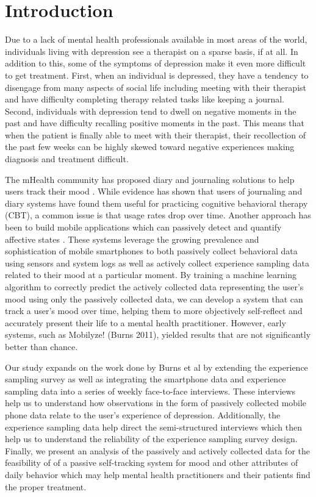 \section{Introduction}

Due to a lack of mental health professionals available in most areas 
of the world, individuals living with depression see a therapist on 
a sparse basis, if at all. In addition to this, some of the symptoms 
of depression make it even more difficult to get treatment. First, 
when an individual is depressed, they have a tendency to disengage 
from many aspects of social life including meeting with their therapist 
and have difficulty completing therapy related tasks like keeping a 
journal. Second, individuals with depression tend to dwell on 
negative moments in the past and have difficulty recalling positive 
moments in the past. This means that when the patient is finally able 
to meet with their therapist, their recollection of the past few weeks 
can be highly skewed toward negative experiences making diagnosis and 
treatment difficult.

The mHealth community has proposed diary and journaling solutions to help
users track their mood \cite{Ahtinen2013}.  While evidence has shown that users
of journaling and diary systems have found them useful for 
practicing cognitive behavioral therapy (CBT), a common issue
is that usage rates drop over time.  Another approach
has been to build mobile applications which can passively detect and
quantify affective states \cite{Burns2011,Lu2012a}. These systems leverage the growing prevalence and sophistication 
of mobile smartphones to both passively collect behavioral data using 
sensors and system logs as well as actively collect experience sampling 
data related to their mood at a particular moment.  By training a 
machine learning algorithm to correctly predict the actively collected 
data representing the user’s mood using only the passively collected data, 
we can develop a system that can track a user’s mood over time, 
helping them to more objectively self-reflect and accurately present 
their life to a mental health practitioner.  However, early systems, 
such as Mobilyze! (Burns 2011), yielded results that are not significantly better 
than chance.

Our study expands on the work done by Burns et al %
by extending the experience sampling survey as 
well as integrating the smartphone data
and experience sampling data into a series of weekly 
face-to-face interviews.  These interviews
help us to understand how observations in the 
form of passively collected mobile phone data
relate to the user's experience of depression.
Additionally, the experience sampling data help 
direct the semi-structured interviews which then
help us to understand the reliability of the 
experience sampling survey design.  Finally,
we present an analysis of the passively
and actively collected data for the feasibility of
of a passive self-tracking system for mood
and other attributes of daily behavior
which may help mental health practitioners
and their patients find the proper 
treatment.
